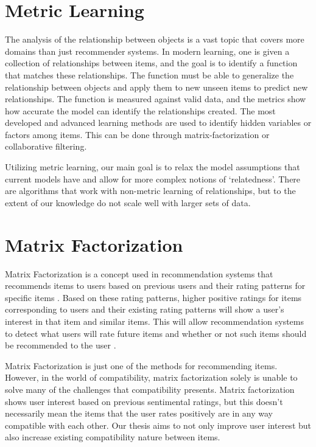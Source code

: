 \section{Metric Learning}
The analysis of the relationship between objects is a vast topic that covers more domains than just recommender systems. In modern learning, one is given a collection of relationships between items, and the goal is to identify a function that matches these relationships. The function must be able to generalize the relationship between objects and apply them to new unseen items to predict new relationships. The function is measured against valid data, and the metrics show how accurate the model can identify the relationships created. The most developed and advanced learning methods are used to identify hidden variables or factors among items. This can be done through matrix-factorization or collaborative filtering. 

Utilizing metric learning, our main goal is to relax the model assumptions that current models have and allow for more complex notions of `relatedness'. There are algorithms that work with non-metric learning of relationships, but to the extent of our knowledge do not scale well with larger sets of data.

\section{Matrix Factorization}
Matrix Factorization is a concept used in recommendation systems that recommends items to users based on previous users and their rating patterns for specific items \cite{koren,koren-2}. Based on these rating patterns, higher positive ratings for items corresponding to users and their existing rating patterns will show a user's interest in that item and similar items. This will allow recommendation systems to detect what users will rate future items and whether or not such items should be recommended to the user \cite{koren,koren-2}. 

Matrix Factorization is just one of the methods for recommending items. However, in the world of compatibility, matrix factorization solely is unable to solve many of the challenges that compatibility presents. Matrix factorization shows user interest based on previous sentimental ratings, but this doesn't necessarily mean the items that the user rates positively are in any way compatible with each other. Our thesis aims to not only improve user interest but also increase existing compatibility nature between items.

